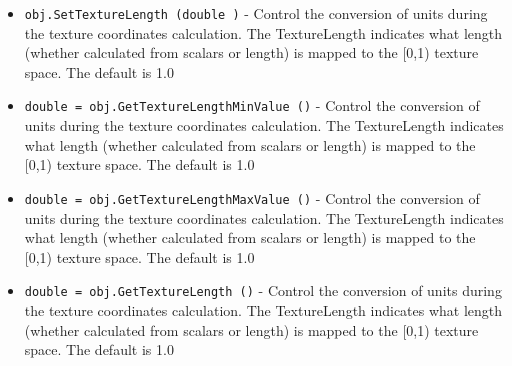 \begin{itemize}
\item  \verb|obj.SetTextureLength (double )| -  Control the conversion of units during the texture coordinates
 calculation. The TextureLength indicates what length (whether 
 calculated from scalars or length) is mapped to the [0,1)
 texture space. The default is 1.0

\item  \verb|double = obj.GetTextureLengthMinValue ()| -  Control the conversion of units during the texture coordinates
 calculation. The TextureLength indicates what length (whether 
 calculated from scalars or length) is mapped to the [0,1)
 texture space. The default is 1.0

\item  \verb|double = obj.GetTextureLengthMaxValue ()| -  Control the conversion of units during the texture coordinates
 calculation. The TextureLength indicates what length (whether 
 calculated from scalars or length) is mapped to the [0,1)
 texture space. The default is 1.0

\item  \verb|double = obj.GetTextureLength ()| -  Control the conversion of units during the texture coordinates
 calculation. The TextureLength indicates what length (whether 
 calculated from scalars or length) is mapped to the [0,1)
 texture space. The default is 1.0

\end{itemize}
